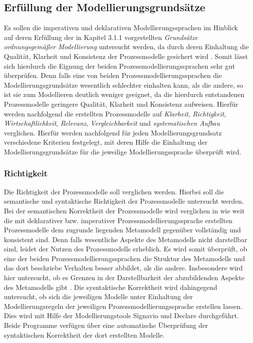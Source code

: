\subsection{Erfüllung der Modellierungsgrundsätze}
Es sollen die imperativen und deklarativen Modellierungssprachen im Hinblick auf deren Erfüllung der in Kapitel 3.1.1 vorgestellten \textit{Grundsätze ordnungsgemäßer Modellierung} untersucht werden, da durch deren Einhaltung die Qualität, Klarheit und Konsistenz der Prozessmodelle gesichert wird \cite{freund2007}. Somit lässt sich hierdurch die Eignung der beiden Prozessmodellierungssprachen sehr gut überprüfen. Denn falls eine von beiden Prozessmodellierungssprachen die Modellierungsgrundsätze wesentlich schlechter einhalten kann, als die andere, so ist sie zum Modellieren deutlich weniger geeignet, da die hierdurch entstandenen Prozessmodelle geringere Qualität, Klarheit und Konsistenz aufweisen. Hierfür werden nachfolgend die erstellten Prozessmodelle auf \textit{Klarheit}, \textit{Richtigkeit}, \textit{Wirtschaftlichkeit}, \textit{Relevanz}, \textit{Vergleichbarkeit} und \textit{systematischen Aufbau} verglichen. Hierfür werden nachfolgend für jeden Modellierungsgrundsatz verschiedene Kriterien festgelegt, mit deren Hilfe die Einhaltung der Modellierungsgrundsätze für die jeweilige Modellierungssprache überprüft wird. \newline

\subsubsection{Richtigkeit}
Die Richtigkeit der Prozessmodelle soll verglichen werden. Hierbei soll die semantische und syntaktische Richtigkeit der Prozessmodelle untersucht werden. \newline
Bei der semantischen Korrektheit der Prozessmodelle wird verglichen in wie weit die mit deklarativer bzw. imperativer Prozessmodellierungssprache erstellten Prozessmodelle dem zugrunde liegenden Metamodell gegenüber vollständig und konsistent sind. Denn falls wesentliche Aspekte des Metamodells nicht darstellbar sind, leidet der Nutzen des Prozessmodells erheblich. Es wird somit überprüft, ob eine der beiden Prozessmodellierungssprachen die Struktur des Metamodells und das dort beschriebe Verhalten besser abbildet, als die andere. Insbesondere wird hier untersucht, ob es Grenzen in der Darstellbarkeit der abzubildenden Aspekte des Metamodells gibt \cite{journals95, becker2012prozessmanagement}. \newline
Die sysntaktische Korrektheit wird dahingegend untersucht, ob sich die jeweiligen Modelle unter Einhaltung der Modellierungsregeln der jeweiligen Prozessmodellierungssprache erstellen lassen. Dies wird mit Hilfe der Modellierungstools Signavio und Declare durchgeführt. Beide Programme verfügen über eine automatische Überprüfung der syntaktischen Korrektheit der dort erstellten Modelle. \newline


